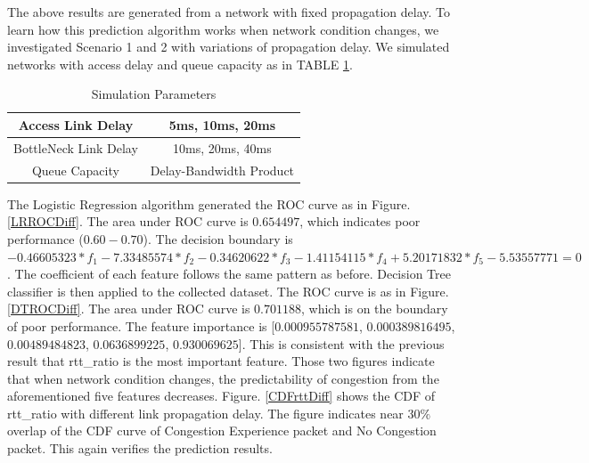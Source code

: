 \par The above results are generated from a network with fixed propagation delay. To learn how this prediction algorithm works when network condition changes, we investigated Scenario 1 and 2 with variations of propagation delay. We simulated networks with access delay and queue capacity as in TABLE \ref{tab:varyRTT}.
\begin{table}
\begin{center}
\caption {Simulation Parameters} \label{tab:varyRTT}
\begin{tabular}{ |c|c| }
 \hline
 Access Link Delay & 5ms, 10ms, 20ms  \\
 \hline
 BottleNeck Link Delay & 10ms, 20ms, 40ms\\
 \hline
 Queue Capacity & Delay-Bandwidth Product\\
 \hline
\end{tabular}
\end{center}
\end{table}
The Logistic Regression algorithm generated the ROC curve as in Figure. \ref{LRROCDiff}. The area under ROC curve is $0.654497$, which indicates poor performance ($0.60-0.70$). The decision boundary is $ -0.46605323*f_{1} - 7.33485574*f_{2} - 0.34620622
*f_{3} - 1.41154115*f_{4} + 5.20171832*f_{5} - 5.53557771 = 0$. The coefficient of each feature follows the same pattern as before. Decision Tree classifier is then applied to the collected dataset. The ROC curve is as in Figure. \ref{DTROCDiff}. The area under ROC curve is $0.701188$, which is on the boundary of poor performance. The feature importance is [$0.000955787581$, $0.000389816495$, $0.00489484823$, $0.0636899225$, $0.930069625$]. This is consistent with the previous result that rtt\_ratio is the most important feature. Those two figures indicate that when network condition changes, the predictability of congestion from the aforementioned five features decreases. Figure. \ref{CDFrttDiff} shows the CDF of rtt\_ratio with different link propagation delay. The figure indicates near $30\%$ overlap of the CDF curve of Congestion Experience packet and No Congestion packet. This again verifies the prediction results.
